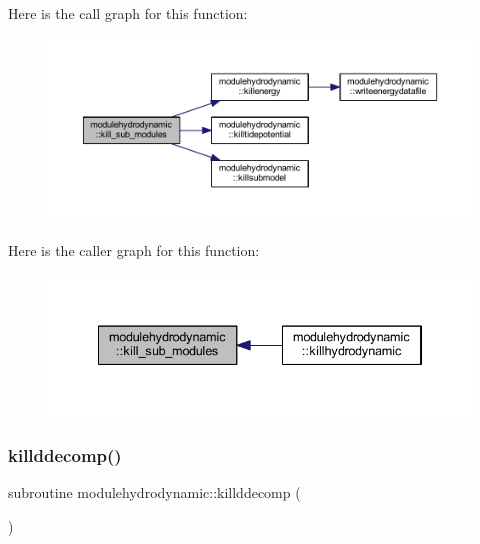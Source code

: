 Here is the call graph for this function\+:\nopagebreak
\begin{figure}[H]
\begin{center}
\leavevmode
\includegraphics[width=350pt]{namespacemodulehydrodynamic_ad33fcf640ab52de6097223c4aeb342c0_cgraph}
\end{center}
\end{figure}
Here is the caller graph for this function\+:\nopagebreak
\begin{figure}[H]
\begin{center}
\leavevmode
\includegraphics[width=334pt]{namespacemodulehydrodynamic_ad33fcf640ab52de6097223c4aeb342c0_icgraph}
\end{center}
\end{figure}
\mbox{\label{namespacemodulehydrodynamic_afcb6ada5d2c8c5ce856cc9efcbb38077}} 
\subsubsection{\texorpdfstring{killddecomp()}{killddecomp()}}
{\footnotesize\ttfamily subroutine modulehydrodynamic\+::killddecomp (\begin{DoxyParamCaption}{ }\end{DoxyParamCaption})\hspace{0.3cm}{\ttfamily [private]}}

